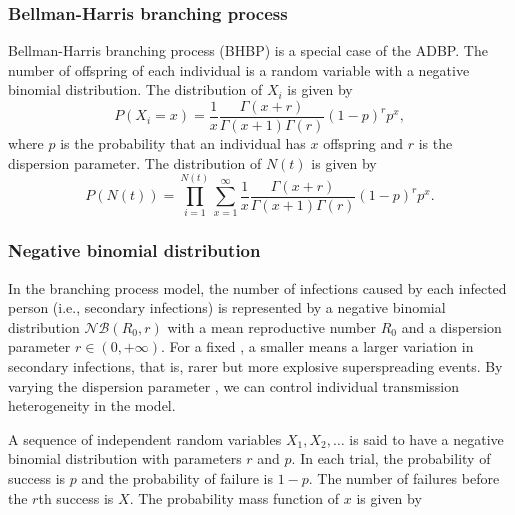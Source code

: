\documentclass{article}
\begin{document}
\subsubsection*{Bellman-Harris branching process}
Bellman-Harris branching process (BHBP) is a special case of the ADBP. The number of offspring of each individual is a random variable with a negative binomial distribution. The distribution of $X_i$ is given by
\begin{equation}
P(X_i = x) = \frac{1}{x} \frac{\Gamma(x+r)}{\Gamma(x+1) \Gamma(r)} (1-p)^r p^x,
\end{equation}
where $p$ is the probability that an individual has $x$ offspring and $r$ is the dispersion parameter. The distribution of $N(t)$ is given by
\begin{equation}
P(N(t)) = \prod_{i=1}^{N(t)} \sum_{x=1}^{\infty} \frac{1}{x} \frac{\Gamma(x+r)}{\Gamma(x+1) \Gamma(r)} (1-p)^r p^x.
\end{equation}

\subsubsection*{Negative binomial distribution}

In the branching process model, the number of infections caused by each infected person (i.e., secondary infections) is represented by a negative binomial distribution $\mathcal{NB}(R_{0}, r)$ with a mean reproductive number $R_{0}$ and a dispersion parameter $r \in (0, +\infty)$. For a fixed , a smaller  means a larger variation in secondary infections, that is, rarer but more explosive superspreading events. By varying the dispersion parameter , we can control individual transmission heterogeneity in the model. 

A sequence of independent random variables $X_1, X_2, \ldots$ is said to have a negative binomial distribution with parameters $r$ and $p$. In each trial, the probability of success is $p$ and the probability of failure is $1-p$. The number of failures before the $r$th success is $X$. The probability mass function of $x$ is given by
\end{document}
